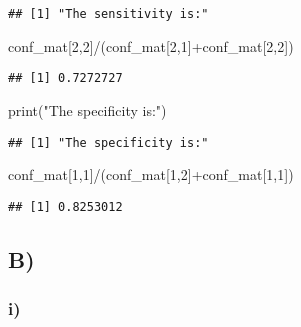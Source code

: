 \documentclass[
]{article}
\newenvironment{Shaded}{\begin{snugshade}}{\end{snugshade}}
\newcommand{\DecValTok}[1]{\textcolor[rgb]{0.00,0.00,0.81}{#1}}
\newcommand{\FunctionTok}[1]{\textcolor[rgb]{0.00,0.00,0.00}{#1}}
\newcommand{\NormalTok}[1]{#1}
\newcommand{\SpecialCharTok}[1]{\textcolor[rgb]{0.00,0.00,0.00}{#1}}
\newcommand{\StringTok}[1]{\textcolor[rgb]{0.31,0.60,0.02}{#1}}
\begin{document}
\begin{verbatim}
## [1] "The sensitivity is:"
\end{verbatim}

\begin{Shaded}
\begin{Highlighting}[]
\NormalTok{conf\_mat[}\DecValTok{2}\NormalTok{,}\DecValTok{2}\NormalTok{]}\SpecialCharTok{/}\NormalTok{(conf\_mat[}\DecValTok{2}\NormalTok{,}\DecValTok{1}\NormalTok{]}\SpecialCharTok{+}\NormalTok{conf\_mat[}\DecValTok{2}\NormalTok{,}\DecValTok{2}\NormalTok{])}
\end{Highlighting}
\end{Shaded}

\begin{verbatim}
## [1] 0.7272727
\end{verbatim}

\begin{Shaded}
\begin{Highlighting}[]
\FunctionTok{print}\NormalTok{(}\StringTok{"The specificity is:"}\NormalTok{)}
\end{Highlighting}
\end{Shaded}

\begin{verbatim}
## [1] "The specificity is:"
\end{verbatim}

\begin{Shaded}
\begin{Highlighting}[]
\NormalTok{conf\_mat[}\DecValTok{1}\NormalTok{,}\DecValTok{1}\NormalTok{]}\SpecialCharTok{/}\NormalTok{(conf\_mat[}\DecValTok{1}\NormalTok{,}\DecValTok{2}\NormalTok{]}\SpecialCharTok{+}\NormalTok{conf\_mat[}\DecValTok{1}\NormalTok{,}\DecValTok{1}\NormalTok{])}
\end{Highlighting}
\end{Shaded}

\begin{verbatim}
## [1] 0.8253012
\end{verbatim}

\hypertarget{b-1}{%
\subsection{B)}\label{b-1}}

\hypertarget{i-1}{%
\subsubsection{i)}\label{i-1}}
\end{document}
